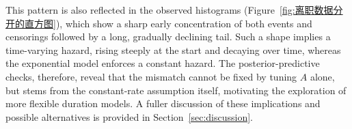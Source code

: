 This pattern is also reflected in the observed histograms (Figure~\ref{fig:离职数据分开的直方图}), which show a sharp early concentration of both events and censorings followed by a long, gradually declining tail. Such a shape implies a time-varying hazard, rising steeply at the start and decaying over time, whereas the exponential model enforces a constant hazard. The posterior-predictive checks, therefore, reveal that the mismatch cannot be fixed by tuning $A$ alone, but stems from the constant-rate assumption itself, motivating the exploration of more flexible duration models. A fuller discussion of these implications and possible alternatives is provided in Section~\ref{sec:discussion}.